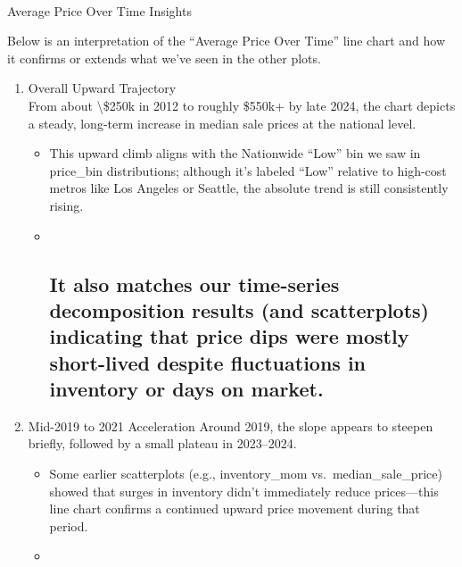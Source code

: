 \documentclass[11pt]{article}
\providecommand{\tightlist}{%
      \setlength{\itemsep}{0pt}\setlength{\parskip}{0pt}}
\begin{document}
    \begin{center}
    \end{center}
    { \hspace*{\fill} \\}
    
    Average Price Over Time Insights

Below is an interpretation of the ``Average Price Over Time'' line chart
and how it confirms or extends what we've seen in the other plots.

\begin{enumerate}
\def\labelenumi{\arabic{enumi}.}
\tightlist
\item
  Overall Upward Trajectory\\
  From about \textbackslash\$250k in 2012 to roughly \$550k+ by late
  2024, the chart depicts a steady, long-term increase in median sale
  prices at the national level.

  \begin{itemize}
  \item
    This upward climb aligns with the Nationwide ``Low'' bin we saw in
    price\_bin distributions; although it's labeled ``Low'' relative to
    high-cost metros like Los Angeles or Seattle, the absolute trend is
    still consistently rising.
  \item ~
    \subsection{It also matches our time-series decomposition results
    (and scatterplots) indicating that price dips were mostly
    short-lived despite fluctuations in inventory or days on
    market.}\label{it-also-matches-our-time-series-decomposition-results-and-scatterplots-indicating-that-price-dips-were-mostly-short-lived-despite-fluctuations-in-inventory-or-days-on-market.}
  \end{itemize}
\item
  Mid-2019 to 2021 Acceleration Around 2019, the slope appears to
  steepen briefly, followed by a small plateau in 2023--2024.

  \begin{itemize}
  \item
    Some earlier scatterplots (e.g., inventory\_mom
    vs.~median\_sale\_price) showed that surges in inventory didn't
    immediately reduce prices---this line chart confirms a continued
    upward price movement during that period.
  \item ~

\end{itemize}
\end{enumerate}
\end{document}
